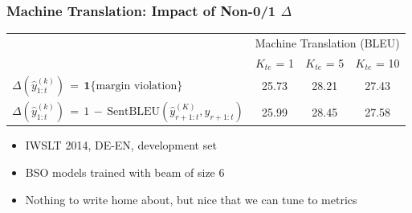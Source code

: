 \documentclass{beamer}
\newcommand{\niceq}{\ensuremath{\,{=}\,}}
\newcommand{\beampred}[2]{\ensuremath{\hat{y}_{1:{#1}}^{({#2})}}}
\begin{document}
\begin{frame}
\frametitle{Machine Translation: Impact of Non-0/1 $\Delta$}
\begin{table}[t!]
  \centering
  \begin{tabular}{lccc}
    \toprule
    & \multicolumn{3}{c}{Machine Translation (BLEU)} \\ 
     &  $K_{te}$ = 1 & $K_{te}$ = 5 & $K_{te}$ = 10 \\ 
    \midrule
       $\Delta(\beampred{t}{k}) \niceq \mathbf{1}\{\text{margin violation}\}$ & 25.73  & 28.21 & 27.43  \\
    $\Delta(\beampred{t}{k}) \niceq 1 \,{-}\,\mathrm{SentBLEU}(\hat{y}_{r+1:t}^{({K})}, y_{r+1:t})$ & 25.99  & 28.45 & 27.58 \\          
    \bottomrule
  \end{tabular}
\end{table}
\begin{itemize}
\item IWSLT 2014, DE-EN, development set
\item BSO models trained with beam of size 6
\item Nothing to write home about, but nice that we can tune to metrics
\end{itemize}
\end{frame}
\end{document}
